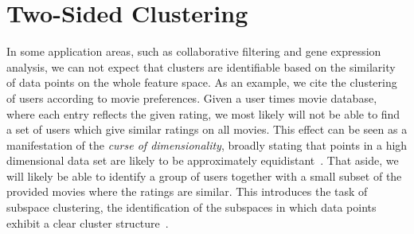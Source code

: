 \section{Two-Sided Clustering}\label{sec:ZS:TwoSided}
In some application areas, such as collaborative filtering and gene expression analysis, we can not expect that clusters are identifiable based on the similarity of data points on the whole feature space. As an example, we cite the clustering of users according to movie preferences. Given a user times movie database, where each entry reflects the given rating, we most likely will not be able to find a set of users which give similar ratings on all movies. This effect can be seen as a manifestation of the \emph{curse of dimensionality}, broadly stating that points in a high dimensional data set are likely to be approximately equidistant~\citep{aggarwal2001surprising,beyer1999nearest}. That aside, we will likely be able to identify a group of users together with a small subset of the provided movies where the ratings are similar. This introduces the task of subspace clustering, the identification of the subspaces in which data points exhibit a clear cluster structure~\citep{kriegel2009clustering}.   

